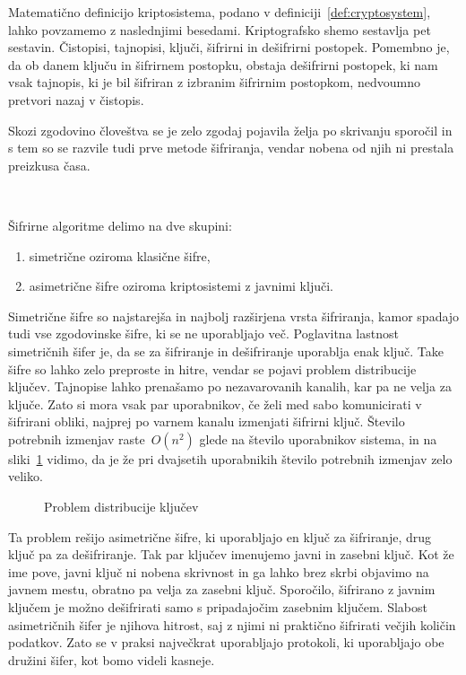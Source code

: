 \documentclass[12pt,a4paper,openany,tikz]{book}
\theoremstyle{plain}
\theoremstyle{definition}
\begin{document}
Matematično definicijo kriptosistema, podano v definiciji~\ref{def:cryptosystem}, lahko povzamemo z naslednjimi besedami. Kriptografsko shemo sestavlja pet sestavin. Čistopisi, tajnopisi, ključi, šifrirni in dešifrirni postopek. Pomembno je, da ob danem ključu in šifrirnem postopku, obstaja dešifrirni postopek, ki nam vsak tajnopis, ki je bil šifriran z izbranim šifrirnim postopkom, nedvoumno pretvori nazaj v čistopis.

Skozi zgodovino človeštva se je zelo zgodaj pojavila želja po skrivanju sporočil in s tem so se razvile tudi prve metode šifriranja, vendar nobena od njih ni prestala preizkusa časa.

\

Šifrirne algoritme delimo na dve skupini:
\begin{enumerate}

	\item simetrične oziroma klasične šifre,
	\item asimetrične šifre oziroma kriptosistemi z javnimi ključi.

\end{enumerate}

Simetrične šifre so najstarejša in najbolj razširjena vrsta šifriranja, kamor spadajo tudi vse zgodovinske šifre, ki se ne uporabljajo več. Poglavitna lastnost simetričnih šifer je, da se za šifriranje in dešifriranje uporablja enak ključ. Take šifre so lahko zelo preproste in hitre, vendar se pojavi problem distribucije ključev. Tajnopise lahko prenašamo po nezavarovanih kanalih, kar pa ne velja za ključe. Zato si mora vsak par uporabnikov, če želi med sabo komunicirati v šifrirani obliki, najprej po varnem kanalu izmenjati šifrirni ključ. Število potrebnih izmenjav raste~$O(n^2)$ glede na število uporabnikov sistema, in na sliki~\ref{fig:symmetricproblem} vidimo, da je že pri dvajsetih uporabnikih število potrebnih izmenjav zelo veliko.

\begin{figure}[ht!]
  \centering
\caption{Problem distribucije ključev}
\label{fig:symmetricproblem}
\end{figure}

Ta problem rešijo asimetrične šifre, ki uporabljajo en ključ za šifriranje, drug ključ pa za dešifriranje. Tak par ključev imenujemo javni in zasebni ključ. Kot že ime pove, javni ključ ni nobena skrivnost in ga lahko brez skrbi objavimo na javnem mestu, obratno pa velja za zasebni ključ. Sporočilo, šifrirano z javnim ključem je možno dešifrirati samo s pripadajočim zasebnim ključem. Slabost asimetričnih šifer je njihova hitrost, saj z njimi ni praktično šifrirati večjih količin podatkov. Zato se v praksi največkrat uporabljajo protokoli, ki uporabljajo obe družini šifer, kot bomo videli kasneje.
\end{document}
